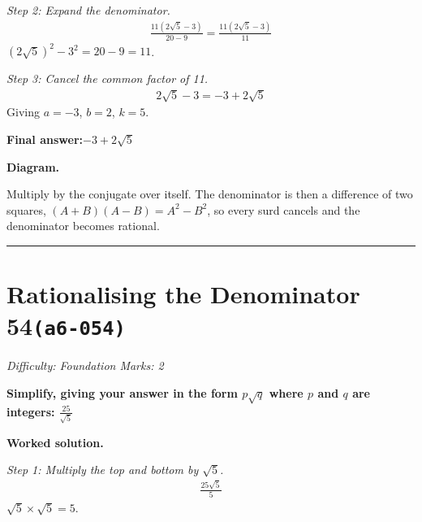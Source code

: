\documentclass[11pt]{article}
\newcommand{\question}[1]{\par\medskip\noindent\textbf{#1}\par}
\begin{document}
\textit{Step 2: Expand the denominator.}
\[\begin{gathered}
\frac{11(2\sqrt{5} - 3)}{20 - 9} = \frac{11(2\sqrt{5} - 3)}{11}
\end{gathered}\]
\( (2\sqrt{5})^2 - 3^2 = 20 - 9 = 11 \).

\textit{Step 3: Cancel the common factor of 11.}
\[\begin{gathered}
2\sqrt{5} - 3 = -3 + 2\sqrt{5}
\end{gathered}\]
Giving \( a = -3 \), \( b = 2 \), \( k = 5 \).

\begin{answerbox}
\textbf{Final answer:}\quad \(\displaystyle -3 + 2\sqrt{5}\)
\end{answerbox}
\textbf{Diagram.}

\begin{center}
\end{center}
\small Multiply by the conjugate over itself. The denominator is then a difference of two squares, $(A+B)(A-B)=A^{2}-B^{2}$, so every surd cancels and the denominator becomes rational.\normalsize

\medskip\hrule

\section*{Rationalising the Denominator 54\quad\small\texttt{(a6-054)}}
\textit{Difficulty: Foundation \quad\textbar\quad Marks: 2}

\question{Simplify, giving your answer in the form \( p\sqrt{q} \) where \( p \) and \( q \) are integers: \( \frac{25}{\sqrt{5}} \)}

\textbf{Worked solution.}

\textit{Step 1: Multiply the top and bottom by \( \sqrt{5} \).}
\[\begin{gathered}
\frac{25\sqrt{5}}{5}
\end{gathered}\]
\( \sqrt{5} \times \sqrt{5} = 5 \).
\end{document}
